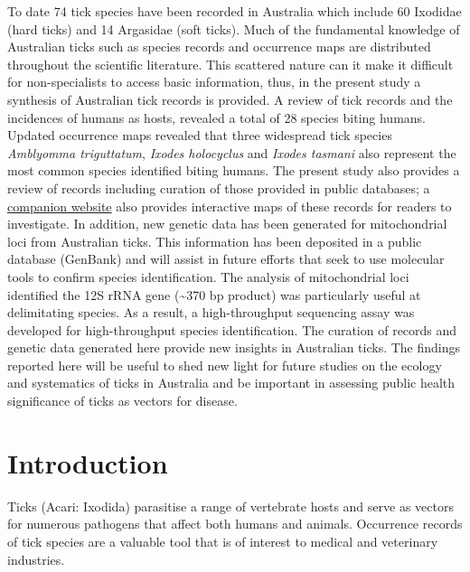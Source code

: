 \documentclass[a4paper, nobind]{templates/ociamthesis}
\begin{document}
To date 74 tick species have been recorded in Australia which include 60 Ixodidae (hard ticks) and 14 Argasidae (soft ticks).
Much of the fundamental knowledge of Australian ticks such as species records and occurrence maps are distributed throughout the scientific literature.
This scattered nature can it make it difficult for non-specialists to access basic information, thus, in the present study a synthesis of Australian tick records is provided.
A review of tick records and the incidences of humans as hosts, revealed a total of 28 species biting humans.
Updated occurrence maps revealed that three widespread tick species \emph{Amblyomma triguttatum}, \emph{Ixodes holocyclus} and \emph{Ixodes tasmani} also represent the most common species identified biting humans.
The present study also provides a review of records including curation of those provided in public databases; a \href{https://siobhonlegan.com/wildlife-ticks/}{companion website} also provides interactive maps of these records for readers to investigate.
In addition, new genetic data has been generated for mitochondrial loci from Australian ticks.
This information has been deposited in a public database (GenBank) and will assist in future efforts that seek to use molecular tools to confirm species identification.
The analysis of mitochondrial loci identified the 12S rRNA gene (\textasciitilde370 bp product) was particularly useful at delimitating species.
As a result, a high-throughput sequencing assay was developed for high-throughput species identification.
The curation of records and genetic data generated here provide new insights in Australian ticks.
The findings reported here will be useful to shed new light for future studies on the ecology and systematics of ticks in Australia and be important in assessing public health significance of ticks as vectors for disease.

\hypertarget{introduction}{%
\section{Introduction}\label{introduction}}

Ticks (Acari: Ixodida) parasitise a range of vertebrate hosts and serve as vectors for numerous pathogens that affect both humans and animals.
Occurrence records of tick species are a valuable tool that is of interest to medical and veterinary industries.
\end{document}
